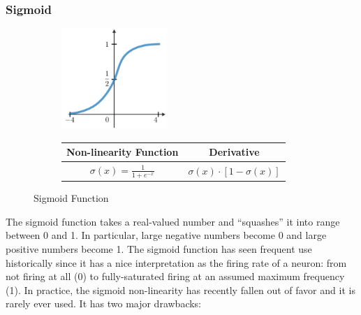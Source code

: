 \documentclass[11pt]{article}
\numberwithin{equation}{section}
\theoremstyle{definition}%
\begin{document}
\subsubsection{Sigmoid}

\begin{figure}[h]
    \begin{center}
        \begin{subfigure}{0.35\textwidth}
            \includegraphics[width=4cm]{./Figs/sigmoid.png}%
        \label{fig:sigmoid_graph}
        \end{subfigure}
        \begin{subfigure}{0.35\textwidth}
            \begin{tabular}{||c c||} 
                \hline
                Non-linearity Function & Derivative \\ [0.5ex] 
                \hline
                $\sigma(x) = \frac{1}{1+e^{-x}}$ & $\sigma(x) \cdot [1-\sigma(x)]$ \\ [1ex] 
                \hline
            \end{tabular}
        \label{fig:sigmoid_math}
        \end{subfigure}
    \end{center}
    \caption{Sigmoid Function}
    \label{fig:sigmoid}
\end{figure}

The sigmoid function takes a real-valued number and “squashes” it into range between 0 and 1. In particular, large negative numbers become 0 and large positive numbers become 1. The sigmoid function has seen frequent use historically since it has a nice interpretation as the firing rate of a neuron: from not firing at all (0) to fully-saturated firing at an assumed maximum frequency (1). In practice, the sigmoid non-linearity has recently fallen out of favor and it is rarely ever used. It has two major drawbacks:
\end{document}
